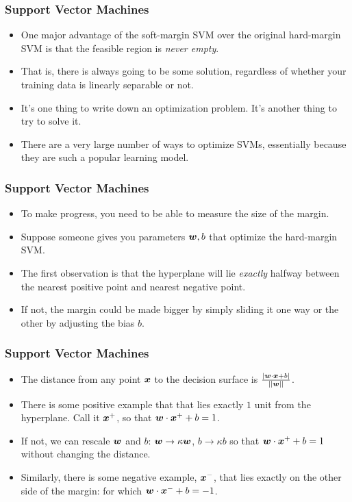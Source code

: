 \documentclass[trans]{beamer}
\begin{document}
\begin{frame}
  \frametitle{Support Vector Machines}
\begin{itemize} 
\item 
One major advantage of the soft-margin SVM over the original
hard-margin SVM is that the feasible region is \emph{never empty}.
\item That is, there is always going to be some solution, regardless of
whether your training data is linearly separable or not.
\item 
It's one thing to write down an optimization problem.  It's another
thing to try to solve it.
\item   There are a very large number of ways to
optimize SVMs, essentially because they are such a popular learning
model.
\end{itemize}
\end{frame}
\begin{frame}
  \frametitle{Support Vector Machines}
\begin{itemize}
\item 
To make progress, you need to be able to measure the size of the
margin. 
\item Suppose someone gives you parameters ${\boldsymbol{w}},b$ that optimize
the hard-margin SVM.  
\item 
The
first observation is that the hyperplane will lie \emph{exactly}
halfway between the nearest positive point and nearest negative point.
\item If not, the margin could be made bigger by simply sliding it one way
or the other by adjusting the bias $b$.
\end{itemize}
\end{frame}
\begin{frame}
  \frametitle{Support Vector Machines}
\begin{itemize}
\item The distance from any point ${\boldsymbol{x}}$ to the decision surface is $\frac{|{\boldsymbol{w}} \cdot {\boldsymbol{x}}+b|}{\left\vert\left\vert {\boldsymbol{w}} \right\vert\right\vert}$.
\item 
There is some positive example that that lies
exactly $1$ unit from the hyperplane.  Call it ${\boldsymbol{x}}^+$, so that
${\boldsymbol{w}} \cdot {\boldsymbol{x}}^++b = 1$.
\item If not, we can rescale ${\boldsymbol{w}}$ and $b$: ${\boldsymbol{w}}\rightarrow \kappa{\boldsymbol{w}}$, $b\rightarrow \kappa b$
so that ${\boldsymbol{w}} \cdot {\boldsymbol{x}}^++b = 1$ without changing the distance.
\item  Similarly, there is some negative example,
${\boldsymbol{x}}^-$, that lies exactly on the other side of the margin: for which
${\boldsymbol{w}} \cdot {\boldsymbol{x}}^-+b = -1$. 
\end{itemize}
\end{frame}
\end{document}

